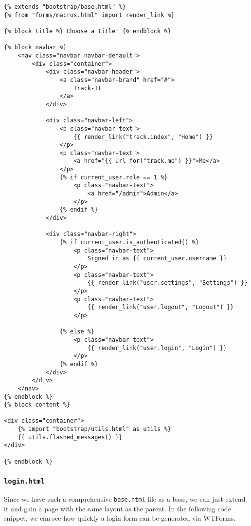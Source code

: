 \documentclass[../main/main.tex]{subfiles}
\begin{document}
\begin{lstlisting}
{% extends "bootstrap/base.html" %}
{% from "forms/macros.html" import render_link %}

{% block title %} Choose a title! {% endblock %}

{% block navbar %}
    <nav class="navbar navbar-default">
        <div class="container">
            <div class="navbar-header">
                <a class="navbar-brand" href="#">
                    Track-It
                </a>
            </div>

            <div class="navbar-left">
                <p class="navbar-text">
                    {{ render_link("track.index", "Home") }}
                </p>
                <p class="navbar-text">
                    <a href="{{ url_for("track.me") }}">Me</a>
                </p>
                {% if current_user.role == 1 %}
                    <p class="navbar-text">
                        <a href="/admin">Admin</a>
                    </p>
                {% endif %}
            </div>

            <div class="navbar-right">
                {% if current_user.is_authenticated() %}
                    <p class="navbar-text">
                        Signed in as {{ current_user.username }}
                    </p>
                    <p class="navbar-text">
                        {{ render_link("user.settings", "Settings") }}
                    </p>
                    <p class="navbar-text">
                        {{ render_link("user.logout", "Logout") }}
                    </p>

                {% else %}
                    <p class="navbar-text">
                        {{ render_link("user.login", "Login") }}
                    </p>
                {% endif %}
            </div>
        </div>
    </nav>
{% endblock %}
{% block content %}

<div class="container">
    {% import "bootstrap/utils.html" as utils %}
    {{ utils.flashed_messages() }}
</div>

{% endblock %}
\end{lstlisting}

\subsubsection{\lstinline|login.html|}

Since we have such a comprehensive \lstinline|base.html| file as a base, we can
just extend it and gain a page with the same layout as the parent. In the
following code snippet, we can see how quickly a login form can be generated via
WTForms. 
\end{document}
